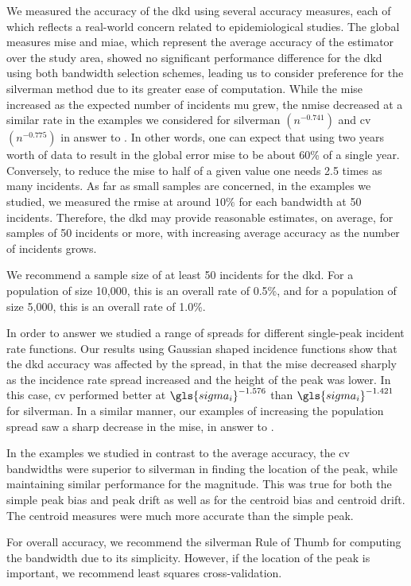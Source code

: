 We measured the accuracy of the \gls{dkd} using several accuracy measures,
each of which reflects a real-world concern related to epidemiological studies.
The global measures \gls{mise} and \gls{miae},
which represent the average accuracy of the estimator over the study area,
showed no significant performance difference
for the \gls{dkd} using both bandwidth selection schemes,
leading us to consider preference for the \gls{silverman} method due to its greater ease of computation.
While the \gls{mise} increased as the expected number of incidents \gls{mu} grew,
the \acrfull{nmise} decreased at a similar rate
in the examples we considered
for \gls{silverman} $(n^{-0.741})$ and \gls{cv} $(n^{-0.775})$ in answer to .
In other words,
one can expect that using two years worth of data
to result in the global error \gls{mise} to be about 60\% of a single year.
Conversely,
to reduce the \gls{mise} to half of a given value
one needs 2.5 times as many incidents.
As far as small samples are concerned,
in the examples we studied,
we measured the \acrfull{rmise} at around $10\%$ for each bandwidth at 50 incidents.
Therefore,
the \gls{dkd} may provide reasonable estimates,
on average,
for samples of 50 incidents or more,
with increasing average accuracy as the number of incidents grows.
\begin{rec}
    \label{rec:small-sample}
    We recommend a sample size of at least 50 incidents for the \gls{dkd}.
    For a population of size 10,000,
    this is an overall rate of 0.5\%,
    and for a population of size 5,000,
    this is an overall rate of 1.0\%.
\end{rec}

In order to answer  we studied a range of spreads for different single-peak incident rate functions.
Our results using Gaussian shaped incidence functions show that the \gls{dkd} accuracy was affected by the spread,
in that the \gls{mise} decreased sharply
as the incidence rate spread increased and the height of the peak was lower.
In this case,
\gls{cv} performed better at $\gls{sigma_i}^{-1.576}$ than $\gls{sigma_i}^{-1.421}$ for \gls{silverman}.
In a similar manner,
our examples of increasing the population spread saw a sharp decrease in the \gls{mise},
in answer to .

In the examples we studied
in contrast to the average accuracy,
the \gls{cv} bandwidths were superior to \gls{silverman}
in finding the location of the peak,
while maintaining similar performance for the magnitude.
This was true for both the simple \gls{peak bias} and \gls{peak drift} as well as for the
\gls{centroid bias} and \gls{centroid drift}.
The centroid measures were much more accurate than the simple peak.
\begin{rec}
    \label{rec:bandwidth-scheme}
    For overall accuracy, we recommend the \gls{silverman} Rule of Thumb for computing the bandwidth due to its simplicity.
    However, if the location of the peak is important, we recommend least squares cross-validation.
\end{rec}

